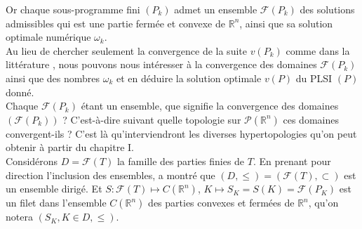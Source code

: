 \documentclass[11pt]{report}
\theoremstyle{styletheorem}
\theoremstyle{styledef}
\theoremstyle{remark}
\newcommand{\Ie}{C'est-à-dire }
\newcommand{\R}{\ensuremath{\mathbb{R}}}
\newcommand{\Pk}{\ensuremath{P_k}  }
\newcommand{\F}{\ensuremath{\mathcal{F}}}
\begin{document}
	Or chaque sous-programme fini $(\Pk)$ admet un ensemble $\F(\Pk)$ des solutions admissibles qui est une partie fermée et convexe de $\R^n$, ainsi que sa solution optimale numérique $\omega_k$.\\
	Au lieu de chercher seulement la convergence de la suite $v(\Pk)$ comme dans la littérature \cite{b2, b3, b16}, nous pouvons nous intéresser à la convergence des domaines $\F(\Pk)$ ainsi que des nombres $\omega_k$ et en déduire la solution optimale $v(P)$ du PLSI $(P)$ donné.\\
	Chaque $\F(\Pk)$ étant un ensemble, que signifie la convergence des domaines $(\F(\Pk))$ ? \Ie suivant quelle topologie sur $\mathcal{P}(\R^n)$ ces domaines convergent-ils ? C'est là qu'interviendront les diverses hypertopologies qu'on peut obtenir à partir du chapitre I. \\
	Considérons $D= \mathscr{F}(T)$ la famille des parties finies de $T$. En prenant pour direction l'inclusion des ensembles, \cite{b11} a montré que $(D,\leq)=(\mathscr{F}(T),\subset)$ est un ensemble dirigé. Et $S \colon \mathscr{F}(T) \mapsto C(\R^n)$, $K \longmapsto S_K = S(K) = \F(P_K)$ est un filet dans l'ensemble $C(\R^n)$ des parties convexes et fermées de $\R^n$, qu'on notera $(S_K, K \in D, \leq)$.
\end{document}
